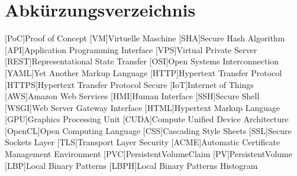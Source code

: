 \documentclass[12pt,oneside]{report}
\begin{document}
  
  
  
  
  
  
  
  

  \chapter*{Abkürzungsverzeichnis}
  \begin{acronym}
    [PoC]{Proof of Concept}
    [VM]{Virtuelle Maschine}
    [SHA]{Secure Hash Algorithm}
    [API]{Application Programming Interface}
    [VPS]{Virtual Private Server}
    [REST]{Representational State Transfer}
    [OSI]{Open Systems Interconnection}
    [YAML]{Yet Another Markup Language}
    [HTTP]{Hypertext Transfer Protocol}
    [HTTPS]{Hypertext Transfer Protocol Secure}
    [IoT]{Internet of Things}
    [AWS]{Amazon Web Services}
    [HMI]{Human Interface}
    [SSH]{Secure Shell}
    [WSGI]{Web Server Gateway Interface}
    [HTML]{Hypertext Markup Language}
    [GPU]{Graphics Processing Unit}
    [CUDA]{Compute Unified Device Architecture}
    [OpenCL]{Open Computing Language}
    [CSS]{Cascading Style Sheets}
    [SSL]{Secure Sockets Layer}
    [TLS]{Transport Layer Security}
    [ACME]{Automatic Certificate Management Environment}
    [PVC]{PersistentVolumeClaim}
    [PV]{PersistentVolume}
    [LBP]{Local Binary Patterns}
    [LBPH]{Local Binary Patterns Histogram}
  \end{acronym}

  \newpage


  \newpage

  
  
  



  \listoffigures
  \newpage

  \lstlistoflistings
  \newpage

  
\end{document}
